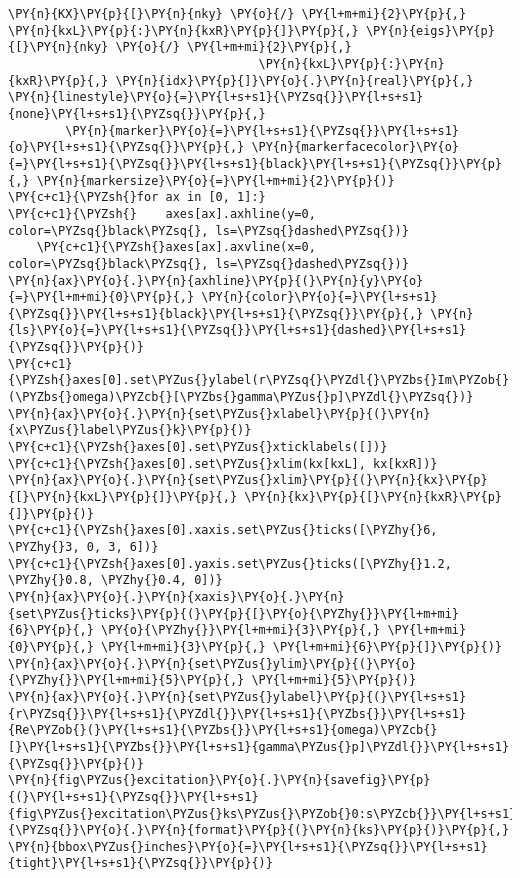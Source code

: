 \begin{Verbatim}[commandchars=\\\{\}]
        \PY{n}{KX}\PY{p}{[}\PY{n}{nky} \PY{o}{/} \PY{l+m+mi}{2}\PY{p}{,} \PY{n}{kxL}\PY{p}{:}\PY{n}{kxR}\PY{p}{]}\PY{p}{,} \PY{n}{eigs}\PY{p}{[}\PY{n}{nky} \PY{o}{/} \PY{l+m+mi}{2}\PY{p}{,}
                                   \PY{n}{kxL}\PY{p}{:}\PY{n}{kxR}\PY{p}{,} \PY{n}{idx}\PY{p}{]}\PY{o}{.}\PY{n}{real}\PY{p}{,} \PY{n}{linestyle}\PY{o}{=}\PY{l+s+s1}{\PYZsq{}}\PY{l+s+s1}{none}\PY{l+s+s1}{\PYZsq{}}\PY{p}{,}
        \PY{n}{marker}\PY{o}{=}\PY{l+s+s1}{\PYZsq{}}\PY{l+s+s1}{o}\PY{l+s+s1}{\PYZsq{}}\PY{p}{,} \PY{n}{markerfacecolor}\PY{o}{=}\PY{l+s+s1}{\PYZsq{}}\PY{l+s+s1}{black}\PY{l+s+s1}{\PYZsq{}}\PY{p}{,} \PY{n}{markersize}\PY{o}{=}\PY{l+m+mi}{2}\PY{p}{)}
\PY{c+c1}{\PYZsh{}for ax in [0, 1]:}
\PY{c+c1}{\PYZsh{}    axes[ax].axhline(y=0, color=\PYZsq{}black\PYZsq{}, ls=\PYZsq{}dashed\PYZsq{})}
    \PY{c+c1}{\PYZsh{}axes[ax].axvline(x=0, color=\PYZsq{}black\PYZsq{}, ls=\PYZsq{}dashed\PYZsq{})}
\PY{n}{ax}\PY{o}{.}\PY{n}{axhline}\PY{p}{(}\PY{n}{y}\PY{o}{=}\PY{l+m+mi}{0}\PY{p}{,} \PY{n}{color}\PY{o}{=}\PY{l+s+s1}{\PYZsq{}}\PY{l+s+s1}{black}\PY{l+s+s1}{\PYZsq{}}\PY{p}{,} \PY{n}{ls}\PY{o}{=}\PY{l+s+s1}{\PYZsq{}}\PY{l+s+s1}{dashed}\PY{l+s+s1}{\PYZsq{}}\PY{p}{)}
\PY{c+c1}{\PYZsh{}axes[0].set\PYZus{}ylabel(r\PYZsq{}\PYZdl{}\PYZbs{}Im\PYZob{}(\PYZbs{}omega)\PYZcb{}[\PYZbs{}gamma\PYZus{}p]\PYZdl{}\PYZsq{})}
\PY{n}{ax}\PY{o}{.}\PY{n}{set\PYZus{}xlabel}\PY{p}{(}\PY{n}{x\PYZus{}label\PYZus{}k}\PY{p}{)}
\PY{c+c1}{\PYZsh{}axes[0].set\PYZus{}xticklabels([])}
\PY{c+c1}{\PYZsh{}axes[0].set\PYZus{}xlim(kx[kxL], kx[kxR])}
\PY{n}{ax}\PY{o}{.}\PY{n}{set\PYZus{}xlim}\PY{p}{(}\PY{n}{kx}\PY{p}{[}\PY{n}{kxL}\PY{p}{]}\PY{p}{,} \PY{n}{kx}\PY{p}{[}\PY{n}{kxR}\PY{p}{]}\PY{p}{)}
\PY{c+c1}{\PYZsh{}axes[0].xaxis.set\PYZus{}ticks([\PYZhy{}6, \PYZhy{}3, 0, 3, 6])}
\PY{c+c1}{\PYZsh{}axes[0].yaxis.set\PYZus{}ticks([\PYZhy{}1.2, \PYZhy{}0.8, \PYZhy{}0.4, 0])}
\PY{n}{ax}\PY{o}{.}\PY{n}{xaxis}\PY{o}{.}\PY{n}{set\PYZus{}ticks}\PY{p}{(}\PY{p}{[}\PY{o}{\PYZhy{}}\PY{l+m+mi}{6}\PY{p}{,} \PY{o}{\PYZhy{}}\PY{l+m+mi}{3}\PY{p}{,} \PY{l+m+mi}{0}\PY{p}{,} \PY{l+m+mi}{3}\PY{p}{,} \PY{l+m+mi}{6}\PY{p}{]}\PY{p}{)}
\PY{n}{ax}\PY{o}{.}\PY{n}{set\PYZus{}ylim}\PY{p}{(}\PY{o}{\PYZhy{}}\PY{l+m+mi}{5}\PY{p}{,} \PY{l+m+mi}{5}\PY{p}{)}
\PY{n}{ax}\PY{o}{.}\PY{n}{set\PYZus{}ylabel}\PY{p}{(}\PY{l+s+s1}{r\PYZsq{}}\PY{l+s+s1}{\PYZdl{}}\PY{l+s+s1}{\PYZbs{}}\PY{l+s+s1}{Re\PYZob{}(}\PY{l+s+s1}{\PYZbs{}}\PY{l+s+s1}{omega)\PYZcb{}[}\PY{l+s+s1}{\PYZbs{}}\PY{l+s+s1}{gamma\PYZus{}p]\PYZdl{}}\PY{l+s+s1}{\PYZsq{}}\PY{p}{)}
\PY{n}{fig\PYZus{}excitation}\PY{o}{.}\PY{n}{savefig}\PY{p}{(}\PY{l+s+s1}{\PYZsq{}}\PY{l+s+s1}{fig\PYZus{}excitation\PYZus{}ks\PYZus{}\PYZob{}0:s\PYZcb{}}\PY{l+s+s1}{\PYZsq{}}\PY{o}{.}\PY{n}{format}\PY{p}{(}\PY{n}{ks}\PY{p}{)}\PY{p}{,} \PY{n}{bbox\PYZus{}inches}\PY{o}{=}\PY{l+s+s1}{\PYZsq{}}\PY{l+s+s1}{tight}\PY{l+s+s1}{\PYZsq{}}\PY{p}{)}


\end{Verbatim}
